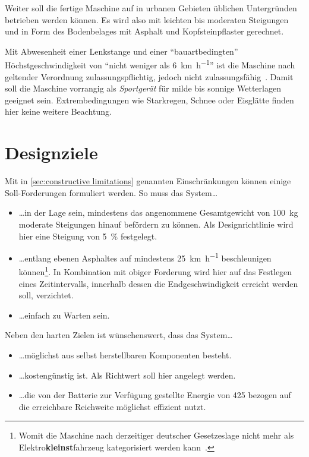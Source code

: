 			Weiter soll die fertige Maschine auf in urbanen Gebieten üblichen Untergründen betrieben werden können.
			Es wird also mit leichten bis moderaten Steigungen und in Form des Bodenbelages mit Asphalt und Kopfsteinpflaster gerechnet.\par\medskip
			Mit Abwesenheit einer Lenkstange und einer ``bauartbedingten'' Höchstgeschwindigkeit von ``nicht weniger als \qty{6}{\kilo\metre\per\hour}'' ist die Maschine nach geltender Verordnung zulassungspflichtig, jedoch nicht zulassungsfähig~\cite{Bundesgesetzblatt.2019}.
			Damit soll die Maschine vorrangig als \textit{Sportgerät} für milde bis sonnige Wetterlagen geeignet sein.
			Extrembedingungen wie Starkregen, Schnee oder Eisglätte finden hier keine weitere Beachtung.

	\section{Designziele}
		Mit in \cref{sec:constructive limitations} genannten Einschränkungen können einige Soll-Forderungen formuliert werden.
		So muss das System\ldots
		\begin{itemize}
			\item \ldots in der Lage sein, mindestens das angenommene Gesamtgewicht von \qty{100}{\kilo\gram} moderate Steigungen hinauf befördern zu können.
			Als Designrichtlinie wird hier eine Steigung von \qty{5}{\percent} festgelegt.
			\item \ldots entlang ebenen Asphaltes auf mindestens \qty{25}{\kilo\metre\per\hour} beschleunigen können\footnote{\hspace{1mm}Womit die Maschine nach derzeitiger deutscher Gesetzeslage nicht mehr als Elektro\textbf{kleinst}fahrzeug kategorisiert werden kann~\cite{Bundesgesetzblatt.2019}.}.
			In Kombination mit obiger Forderung wird hier auf das Festlegen eines Zeitintervalls, innerhalb dessen die Endgeschwindigkeit erreicht werden soll, verzichtet.
			\item \ldots einfach zu Warten sein.
		\end{itemize}
		Neben den harten Zielen ist wünschenswert, dass das System\ldots
		\begin{itemize}
			\item \ldots möglichst aus selbst herstellbaren Komponenten besteht.
			\item \ldots kostengünstig ist.
			Als Richtwert soll hier  angelegt werden.
			\item \ldots die von der Batterie zur Verfügung gestellte Energie von \SI{425}{\watthour} bezogen auf die erreichbare Reichweite möglichst effizient nutzt.
		\end{itemize}